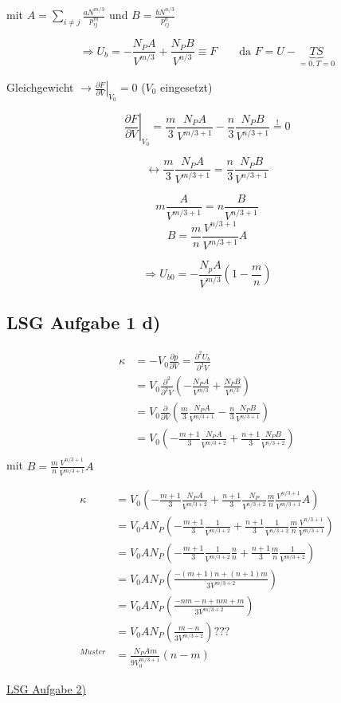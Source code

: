 mit $A=\sum_{i\neq j}\frac{aN^{m/3}}{p^m_{ij}}$ und $B=\frac{bN^{n/3}}{p^n_{ij}}$

$$\Rightarrow U_b = -\frac{N_PA}{V^{m/3}}+\frac{N_PB}{V^{n/3}}\equiv F \qquad \text{da } F=U-\underbrace{TS}_{=0,T=0}$$

Gleichgewicht $\rightarrow \left. \frac{\partial F}{\partial V}\right|_{V_0}=0$ ($V_0$ eingesetzt)

$$\left. \frac{\partial F}{\partial V}\right|_{V_0}=\frac{m}{3}\frac{N_PA}{V^{m/3+1}}-\frac{n}{3}\frac{N_PB}{V^{n/3+1}}\stackrel{\mathrm{!}}=0$$

$$\leftrightarrow \frac{m}{3}\frac{N_PA}{V^{m/3+1}}=\frac{n}{3}\frac{N_PB}{V^{n/3+1}}$$

$$m\frac{A}{V^{m/3+1}}=n\frac{B}{V^{n/3+1}}$$
$$ B=\frac{m}{n}\frac{V^{n/3+1}}{V^{m/3+1}}A $$




$$\Rightarrow U_{b0}= -\frac{N_pA}{V^{m/3}}(1-\frac{m}{n})$$


\subsection*{LSG Aufgabe 1 d)}

\begin{align}
\kappa &= - V_0\frac{\partial p}{\partial V}= \frac{\partial^2 U_b}{\partial^2 V}\\
&= V_0\frac{\partial^2}{\partial^2 V}\left(-\frac{N_PA}{V^{m/3}}+\frac{N_PB}{V^{n/3}}\right)\\
&= V_0\frac{\partial}{\partial V}\left(\frac{m}{3}\frac{N_PA}{V^{m/3+1}}-\frac{n}{3}\frac{N_PB}{V^{n/3+1}}\right)\\
&= V_0\left(-\frac{m+1}{3}\frac{N_PA}{V^{m/3+2}}+\frac{n+1}{3}\frac{N_PB}{V^{n/3+2}}\right)\\
\end{align}
mit $ B=\frac{m}{n}\frac{V^{n/3+1}}{V^{m/3+1}}A $

\begin{align}
\kappa &= V_0\left(-\frac{m+1}{3}\frac{N_PA}{V^{m/3+2}}+\frac{n+1}{3}\frac{N_P}{V^{n/3+2}}\frac{m}{n}\frac{V^{n/3+1}}{V^{m/3+1}}A \right)\\
&= V_0AN_P\left(-\frac{m+1}{3}\frac{1}{V^{m/3+2}}+\frac{n+1}{3}\frac{1}{V^{n/3+2}}\frac{m}{n}\frac{V^{n/3+1}}{V^{m/3+1}} \right)\\
&= V_0AN_P\left(-\frac{m+1}{3}\frac{1}{V^{m/3+2}}\frac{n}{n}+\frac{n+1}{3}\frac{m}{n}\frac{1}{V^{m/3+2}} \right)\\
&= V_0AN_P\left(\frac{-(m+1)n+(n+1)m}{3V^{m/3+2}} \right)\\
&= V_0AN_P\left(\frac{-nm-n+nm+m}{3V^{m/3+2}} \right)\\
&= V_0AN_P\left(\frac{m-n}{3V^{m/3+2}} \right)???\\
^{Muster}&=\frac{N_PAm}{9V^{m/3+1}_0}(n-m)
\end{align}



\underline{LSG Aufgabe 2)}






